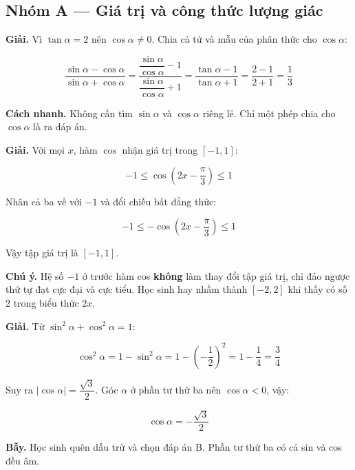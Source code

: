 \documentclass[11pt, a4paper]{article}
\begin{document}

\subsection*{Nhóm A — Giá trị và công thức lượng giác}

\begin{dapan}[1 — Đáp án D]
\textbf{Giải.} Vì $\tan\alpha = 2$ nên $\cos\alpha \neq 0$. Chia cả tử và mẫu của phân thức cho $\cos\alpha$:

$$\frac{\sin\alpha - \cos\alpha}{\sin\alpha + \cos\alpha} = \frac{\dfrac{\sin\alpha}{\cos\alpha} - 1}{\dfrac{\sin\alpha}{\cos\alpha} + 1} = \frac{\tan\alpha - 1}{\tan\alpha + 1} = \frac{2-1}{2+1} = \frac{1}{3}$$

\textbf{Cách nhanh.} Không cần tìm $\sin\alpha$ và $\cos\alpha$ riêng lẻ. Chỉ một phép chia cho $\cos\alpha$ là ra đáp án.
\end{dapan}

\begin{dapan}[2 — Đáp án B]
\textbf{Giải.} Với mọi $x$, hàm $\cos$ nhận giá trị trong $[-1, 1]$:

$$-1 \le \cos\!\left(2x - \frac{\pi}{3}\right) \le 1$$

Nhân cả ba vế với $-1$ và đổi chiều bất đẳng thức:

$$-1 \le -\cos\!\left(2x - \frac{\pi}{3}\right) \le 1$$

Vậy tập giá trị là $[-1, 1]$.

\textbf{Chú ý.} Hệ số $-1$ ở trước hàm cos \textbf{không} làm thay đổi tập giá trị, chỉ đảo ngược thứ tự đạt cực đại và cực tiểu. Học sinh hay nhầm thành $[-2, 2]$ khi thấy có số $2$ trong biểu thức $2x$.
\end{dapan}

\begin{dapan}[3 — Đáp án A]
\textbf{Giải.} Từ $\sin^2\alpha + \cos^2\alpha = 1$:

$$\cos^2\alpha = 1 - \sin^2\alpha = 1 - \left(-\frac{1}{2}\right)^2 = 1 - \frac{1}{4} = \frac{3}{4}$$

Suy ra $|\cos\alpha| = \dfrac{\sqrt{3}}{2}$. Góc $\alpha$ ở phần tư thứ ba nên $\cos\alpha < 0$, vậy:

$$\cos\alpha = -\frac{\sqrt{3}}{2}$$

\textbf{Bẫy.} Học sinh quên dấu trừ và chọn đáp án B. Phần tư thứ ba có cả sin và cos đều âm.
\end{dapan}
\end{document}
